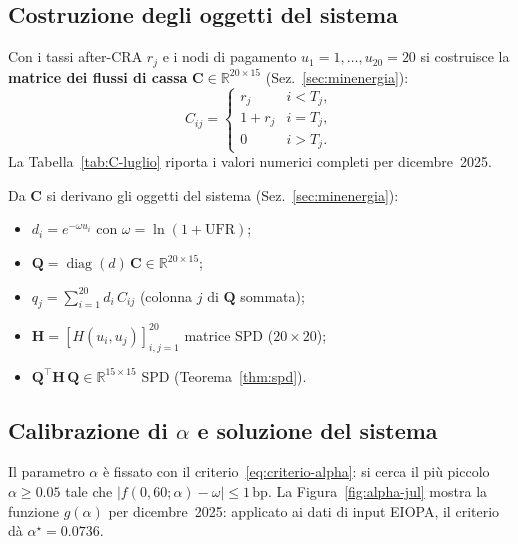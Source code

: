 \documentclass[11pt,a4paper]{article}
\theoremstyle{plain}
\theoremstyle{definition}
\theoremstyle{remark}
\newcommand{\UFR}{\ensuremath{\mathrm{UFR}}}
\newcommand{\CRA}{\ensuremath{\mathrm{CRA}}}
\newcommand{\Qmat}{\mathbf{Q}}
\newcommand{\Hmat}{\mathbf{H}}
\begin{document}

\subsection{Costruzione degli oggetti del sistema}

Con i tassi after-CRA $r_j$ e i nodi di pagamento $u_1=1,\dots,u_{20}=20$ si costruisce
la \textbf{matrice dei flussi di cassa} $\mathbf{C} \in \mathbb{R}^{20 \times 15}$
(Sez.~\ref{sec:minenergia}):
\[
  C_{ij} = \begin{cases}
    r_j     & i < T_j,\\
    1 + r_j & i = T_j,\\
    0       & i > T_j.
  \end{cases}
\]
La Tabella~\ref{tab:C-luglio} riporta i valori numerici completi per dicembre~2025.



Da $\mathbf{C}$ si derivano gli oggetti del sistema (Sez.~\ref{sec:minenergia}):
\begin{itemize}
  \item $d_i = e^{-\omega u_i}$ con $\omega = \ln(1{+}\UFR)$;
  \item $\Qmat = \operatorname{diag}(d)\,\mathbf{C} \in \mathbb{R}^{20\times 15}$;
  \item $q_j = \sum_{i=1}^{20} d_i\, C_{ij}$ (colonna $j$ di $\Qmat$ sommata);
  \item $\Hmat = [H(u_i,u_j)]_{i,j=1}^{20}$ matrice SPD ($20\times 20$);
  \item $\Qmat^\top \Hmat\, \Qmat \in \mathbb{R}^{15\times 15}$ SPD (Teorema~\ref{thm:spd}).
\end{itemize}

\subsection{Calibrazione di $\alpha$ e soluzione del sistema}

Il parametro $\alpha$ \`e fissato con il criterio~\eqref{eq:criterio-alpha}: si cerca il
pi\`u piccolo $\alpha \ge 0.05$ tale che $|f(0,60;\alpha)-\omega| \le 1\,\text{bp}$.
La Figura~\ref{fig:alpha-jul} mostra la funzione $g(\alpha)$ per dicembre~2025: applicato ai
dati di input EIOPA, il criterio d\`a $\alpha^\star = 0.0736$.
\end{document}
